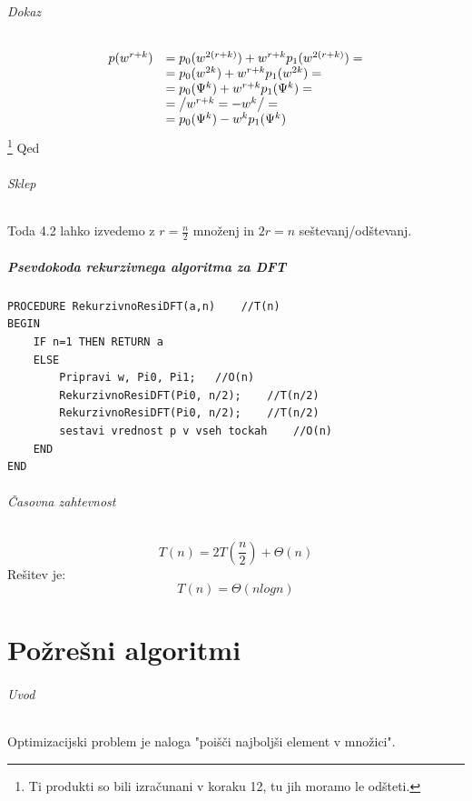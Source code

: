 \documentclass[a4paper,10pt]{article}
\begin{document}
\paragraph{Dokaz}
$$
\begin{array}{rl}
p(w^{r+k}) & = p_0(w^{2(r+k)}) + w^{r+k}p_1(w^{2(r+k)}) = \\
 & = p_0(w^{2k}) + w^{r+k}p_1(w^{2k}) = \\
 & = p_0(\Psi ^k) + w^{r+k}p_1(\Psi ^k) = \\
 & = \left / w^{r+k} = -w^k \right / = \\
 & = p_0(\Psi ^k) - w^kp_1(\Psi ^k) 
\end{array}
$$
\footnote[1]{Ti produkti so bili izra\v cunani v koraku 12, tu jih moramo le od\v steti.}
Qed

\paragraph{Sklep}
Toda 4.2 lahko izvedemo z $r = \frac{n}{2}$ mno\v zenj in $2r = n$ se\v stevanj/od\v stevanj.

\subsubsection{Psevdokoda rekurzivnega algoritma za DFT}

\begin{lstlisting}
PROCEDURE RekurzivnoResiDFT(a,n)	//T(n)
BEGIN
    IF n=1 THEN RETURN a
    ELSE
        Pripravi w, Pi0, Pi1;	//O(n)
        RekurzivnoResiDFT(Pi0, n/2);	//T(n/2)
        RekurzivnoResiDFT(Pi0, n/2);	//T(n/2)
        sestavi vrednost p v vseh tockah	//O(n)
    END
END
\end{lstlisting}


\paragraph{\v Casovna zahtevnost}
$$T(n) = 2T(\frac{n}{2}) + \Theta (n)$$
Re\v sitev je:
$$T(n) = \Theta (n log n)$$

\part{Po\v zre\v sni algoritmi}

\paragraph{Uvod}
Optimizacijski problem je naloga "poi\v s\v ci najbolj\v si element v mno\v zici".
\end{document}
